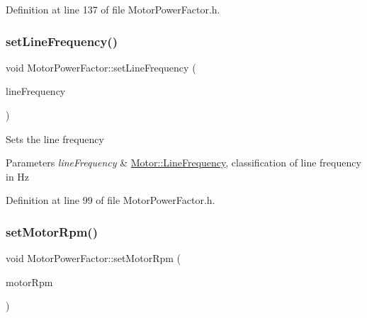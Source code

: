 Definition at line 137 of file Motor\+Power\+Factor.\+h.

\mbox{\label{class_motor_power_factor_a5186ccae4191cfc5b2b7c3bdbd166563}} 
\subsubsection{\texorpdfstring{set\+Line\+Frequency()}{setLineFrequency()}}
{\footnotesize\ttfamily void Motor\+Power\+Factor\+::set\+Line\+Frequency (\begin{DoxyParamCaption}\item[{\hyperlink{class_motor_acee1bdf1b684ad36cb80dc2829d9fcee}{Motor\+::\+Line\+Frequency}}]{line\+Frequency }\end{DoxyParamCaption})\hspace{0.3cm}{\ttfamily [inline]}}

Sets the line frequency


\begin{DoxyParams}{Parameters}
{\em line\+Frequency} & \hyperlink{class_motor_acee1bdf1b684ad36cb80dc2829d9fcee}{Motor\+::\+Line\+Frequency}, classification of line frequency in Hz \\
\hline
\end{DoxyParams}


Definition at line 99 of file Motor\+Power\+Factor.\+h.

\mbox{\label{class_motor_power_factor_a4154bf52c6c9c9e5fb2f0985d7ae3531}} 
\subsubsection{\texorpdfstring{set\+Motor\+Rpm()}{setMotorRpm()}}
{\footnotesize\ttfamily void Motor\+Power\+Factor\+::set\+Motor\+Rpm (\begin{DoxyParamCaption}\item[{double}]{motor\+Rpm }\end{DoxyParamCaption})\hspace{0.3cm}{\ttfamily [inline]}}

